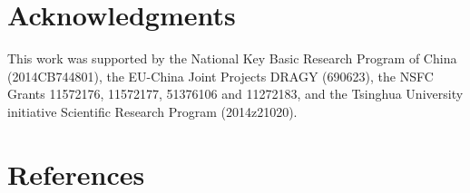 \documentclass{AIAA}
\begin{document}
\section*{Acknowledgments}
This work was supported by the National Key Basic Research Program of China (2014CB744801), the EU-China Joint Projects DRAGY (690623), the NSFC Grants 11572176, 11572177, 51376106 and 11272183, and the Tsinghua University initiative Scientific Research Program (2014z21020).

\section*{References}


\end{document}
